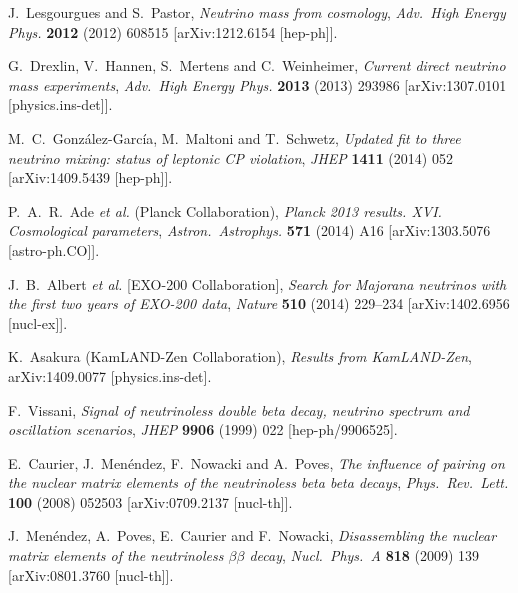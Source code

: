 \documentclass{PoS}
\begin{document}
\begin{thebibliography}{99}
   J.~Lesgourgues and S.~Pastor,
   \emph{Neutrino mass from cosmology},
   \emph{Adv.\ High Energy Phys.} {\bf 2012} (2012) 608515
   [arXiv:1212.6154 [hep-ph]].

   G.~Drexlin, V.~Hannen, S.~Mertens and C.~Weinheimer,
   \emph{Current direct neutrino mass experiments},
   \emph{Adv.\ High Energy Phys.} {\bf 2013} (2013) 293986
   [arXiv:1307.0101 [physics.ins-det]].

   M.~C.~Gonz\'alez-Garc\'ia, M.~Maltoni and T.~Schwetz,
   \emph{Updated fit to three neutrino mixing: status of leptonic CP violation},
   \emph{JHEP} {\bf 1411} (2014) 052
   [arXiv:1409.5439 [hep-ph]].

   P.~A.~R.~Ade {\it et al.} (Planck Collaboration),
   \emph{Planck 2013 results. XVI. Cosmological parameters},
   \emph{Astron.\ Astrophys.} {\bf 571} (2014) A16
   [arXiv:1303.5076 [astro-ph.CO]].

   J.~B.~Albert {\it et al.}  [EXO-200 Collaboration],
   \emph{Search for Majorana neutrinos with the first two years of EXO-200 data},
   \emph{Nature} {\bf 510} (2014) 229--234
   [arXiv:1402.6956 [nucl-ex]].

   K.~Asakura (KamLAND-Zen Collaboration),
   \emph{Results from KamLAND-Zen},
   arXiv:1409.0077 [physics.ins-det].

   F.~Vissani,
   \emph{Signal of neutrinoless double beta decay, neutrino spectrum and
   oscillation scenarios},
   \emph{JHEP} {\bf 9906} (1999) 022
   [hep-ph/9906525].

   E.~Caurier, J.~Men\'endez, F.~Nowacki and A.~Poves,
   \emph{The influence of pairing on the nuclear matrix elements of the neutrinoless beta beta decays},
   \emph{Phys.\ Rev.\ Lett.} {\bf 100} (2008) 052503
   [arXiv:0709.2137 [nucl-th]].

   J.~Men\'endez, A.~Poves, E.~Caurier and F.~Nowacki,
   \emph{Disassembling the nuclear matrix elements of the neutrinoless $\beta\beta$ decay},
   \emph{Nucl.\ Phys.\ A} {\bf 818} (2009) 139
   [arXiv:0801.3760 [nucl-th]].


\end{thebibliography}
\end{document}
